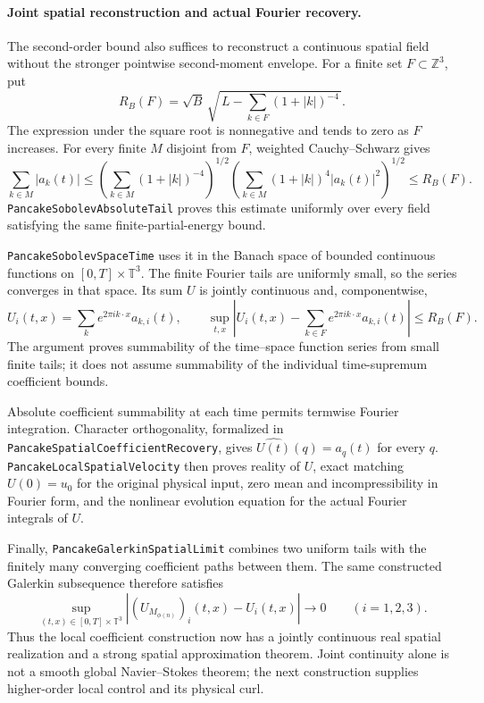 \documentclass[11pt]{article}
\theoremstyle{definition}
\begin{document}
\paragraph{Joint spatial reconstruction and actual Fourier recovery.}
The second-order bound also suffices to reconstruct a continuous spatial
field without the stronger pointwise second-moment envelope. For a finite
set $F\subset\mathbb Z^3$, put
\[
 R_B(F)=\sqrt B\,
   \sqrt{\,L-\sum_{k\in F}(1+|k|)^{-4}\,}.
\]
The expression under the square root is nonnegative and tends to zero as
$F$ increases. For every finite $M$ disjoint from $F$, weighted
Cauchy--Schwarz gives
\[
 \sum_{k\in M}|a_k(t)|
 \le
 \left(\sum_{k\in M}(1+|k|)^{-4}\right)^{1/2}
 \left(\sum_{k\in M}(1+|k|)^4|a_k(t)|^2\right)^{1/2}
 \le R_B(F).
\]
\texttt{PancakeSobolevAbsoluteTail} proves this estimate uniformly over
every field satisfying the same finite-partial-energy bound.

\texttt{PancakeSobolevSpaceTime} uses it in the Banach space of bounded
continuous functions on $[0,T]\times\mathbb T^3$. The finite Fourier tails
are uniformly small, so the series converges in that space. Its sum $U$
is jointly continuous and, componentwise,
\[
 U_i(t,x)=\sum_k e^{2\pi i k\cdot x}a_{k,i}(t),\qquad
 \sup_{t,x}\left|U_i(t,x)-\sum_{k\in F}e^{2\pi i k\cdot x}a_{k,i}(t)\right|
       \le R_B(F).
\]
The argument proves summability of the time--space function series from
small finite tails; it does not assume summability of the individual
time-supremum coefficient bounds.

Absolute coefficient summability at each time permits termwise Fourier
integration. Character orthogonality, formalized in
\texttt{PancakeSpatialCoefficientRecovery}, gives
$\widehat{U(t)}(q)=a_q(t)$ for every $q$.
\texttt{PancakeLocalSpatialVelocity} then proves reality of $U$, exact
matching $U(0)=u_0$ for the original physical input, zero mean and
incompressibility in Fourier form, and the nonlinear evolution equation
for the actual Fourier integrals of $U$.

Finally, \texttt{PancakeGalerkinSpatialLimit} combines two uniform tails
with the finitely many converging coefficient paths between them. The
same constructed Galerkin subsequence therefore satisfies
\[
 \sup_{(t,x)\in[0,T]\times\mathbb T^3}
       |(U_{M_{\phi(n)}})_i(t,x)-U_i(t,x)|\longrightarrow0
       \qquad (i=1,2,3).
\]
Thus the local coefficient construction now has a jointly continuous real
spatial realization and a strong spatial approximation theorem. Joint
continuity alone is not a smooth global Navier--Stokes theorem; the next
construction supplies higher-order local control and its physical curl.
\end{document}
